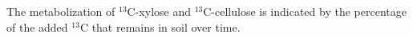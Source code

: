 The metabolization of $^{13}$C-xylose and $^{13}$C-cellulose is indicated by
the percentage of the added $^{13}$C that remains in soil over time.
